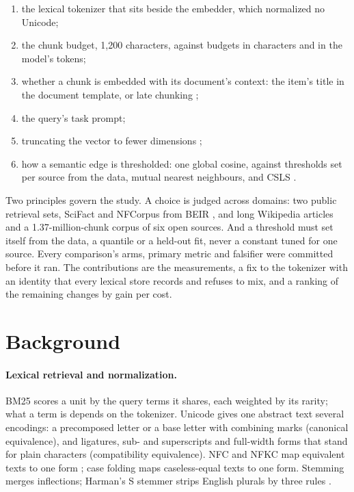 \documentclass[11pt]{article}
\theoremstyle{plain}
\theoremstyle{definition}
\theoremstyle{remark}
\begin{document}
\begin{enumerate}
\item the lexical tokenizer that sits beside the embedder, which normalized no Unicode;
\item the chunk budget, 1{,}200 characters, against budgets in characters and in the model's tokens;
\item whether a chunk is embedded with its document's context: the item's title in the document
  template, or late chunking \citep{gunther2024late};
\item the query's task prompt;
\item truncating the vector to fewer dimensions \citep{kusupati2022matryoshka};
\item how a semantic edge is thresholded: one global cosine, against thresholds set per source
  from the data, mutual nearest neighbours, and CSLS \citep{conneau2018word}.
\end{enumerate}

Two principles govern the study. A choice is judged across domains: two public retrieval sets,
SciFact \citep{wadden2020scifact} and NFCorpus \citep{boteva2016nfcorpus} from BEIR
\citep{thakur2021beir}, and long Wikipedia articles and a 1.37-million-chunk corpus of six open
sources. And a threshold must set itself from the data, a quantile or a held-out fit, never a
constant tuned for one source. Every comparison's arms, primary metric and falsifier were
committed before it ran. The contributions are the measurements, a fix to the tokenizer with an
identity that every lexical store records and refuses to mix, and a ranking of the remaining
changes by gain per cost.

\section{Background}

\paragraph{Lexical retrieval and normalization.} BM25 \citep{robertson2009bm25} scores a unit by
the query terms it shares, each weighted by its rarity; what a term is depends on the tokenizer.
Unicode gives one abstract text several encodings: a precomposed letter or a base letter with
combining marks (canonical equivalence), and ligatures, sub- and superscripts and full-width forms
that stand for plain characters (compatibility equivalence). NFC and NFKC map equivalent texts to
one form \citep{uax15}; case folding maps caseless-equal texts to one form. Stemming merges
inflections; Harman's S stemmer strips English plurals by three rules
\citep{harman1991suffixing}.
\end{document}
